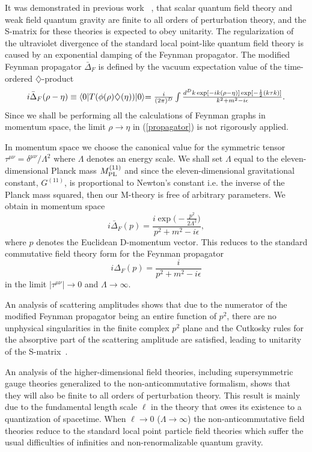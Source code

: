 \documentclass[a4paper,12pt]{article}
\begin{document}
It was demonstrated in previous work
~\cite{Moffat3,Moffat4,Moffat5}, that scalar quantum
field theory and weak field quantum gravity are finite to all orders of
perturbation theory, and the S-matrix for these theories is expected to
obey unitarity. The regularization of the ultraviolet divergence of the
standard local point-like quantum field theory is caused by an exponential
damping of the Feynman propagator. The modified Feynman propagator ${\bar\Delta}_F$
is defined by the vacuum expectation value of the time-ordered
$\diamondsuit$-product
\begin{equation}
\label{propagator}
i{\bar\Delta}_F(\rho-\eta)\equiv\langle 0\vert
T(\phi(\rho)\diamondsuit(\eta))\vert 0 \rangle
$$ $$
=\frac{i}{(2\pi)^D}\int\frac{d^Dk\exp[-ik(\rho-\eta)]\exp[-\frac{1}{2}(k\tau
k)]}{k^2+m^2-i\epsilon}.
\end{equation}
Since we shall be performing all the
calculations of Feynman graphs in momentum space, the
limit $\rho\rightarrow\eta$ in (\ref{propagator}) is
not rigorously applied.

In momentum space we choose
the canonical value for the symmetric tensor
$\tau^{\mu\nu}=\delta^{\mu\nu}/\Lambda^2$ where $\Lambda$
denotes an energy scale. We shall set $\Lambda$ equal to the
eleven-dimensional Planck mass $M^{(11)}_{\rm PL}$ and since the
eleven-dimensional gravitational constant, $G^{(11)}$, is
proportional to Newton's constant i.e. the inverse of the Planck
mass squared, then our M-theory is free of arbitrary parameters.
We obtain in momentum space
\begin{equation}
i{\bar\Delta}_F(p)=\frac{i\exp\biggl(-\frac{p^2}{2\Lambda^2}\biggr)}
{p^2+m^2-i\epsilon},
\end{equation}
where $p$ denotes the Euclidean D-momentum vector. This
reduces to the standard commutative field theory form for the
Feynman propagator
\begin{equation}
i\Delta_F(p)=\frac{i}{p^2+m^2-i\epsilon}
\end{equation} in
the limit $\vert\tau^{\mu\nu}\vert\rightarrow 0$ and
$\Lambda\rightarrow\infty$.

An analysis of scattering amplitudes shows that due to
the numerator of the modified Feynman propagator being an entire function
of $p^2$, there are no unphysical singularities in the finite complex $p^2$
plane and the Cutkosky rules for the absorptive part of the scattering
amplitude are satisfied, leading to unitarity of the
S-matrix~\cite{Moffat4}.

An analysis of the higher-dimensional field theories,
including supersymmetric gauge theories generalized to the
non-anticommutative formalism, shows that they will also be finite to all
orders of perturbation theory. This result is mainly due to the
fundamental length scale $\ell$ in the theory that owes its existence
to a quantization of spacetime. When $\ell\rightarrow 0$
($\Lambda\rightarrow\infty$) the non-anticommutative field theories reduce
to the standard local point particle field theories which suffer the usual
difficulties of infinities and non-renormalizable quantum gravity.
\end{document}
